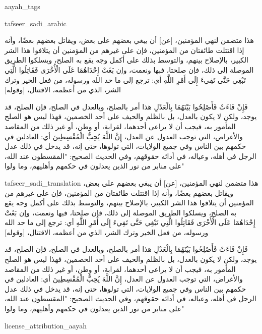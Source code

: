 \begin{taggedblock}{aayah_tags}
\end{taggedblock}
\begin{taggedblock}{tafseer_sadi_arabic}
\begin{Arabic}
هذا متضمن لنهي المؤمنين،
[عن]
أن يبغي بعضهم على بعض، ويقاتل  بعضهم بعضًا، وأنه إذا اقتتلت طائفتان من المؤمنين، فإن على غيرهم من المؤمنين أن يتلافوا هذا الشر الكبير، بالإصلاح بينهم، والتوسط بذلك على أكمل وجه يقع به الصلح، ويسلكوا الطريق الموصلة إلى ذلك، فإن صلحتا، فبها ونعمت، وإن
{ بَغَتْ إِحْدَاهُمَا عَلَى الْأُخْرَى فَقَاتِلُوا الَّتِي تَبْغِي حَتَّى تَفِيءَ إِلَى أَمْرِ اللَّهِ }
أي: ترجع إلى ما حد الله ورسوله، من فعل الخير وترك الشر، الذي من أعظمه، الاقتتال،
[وقوله]

{ فَإِنْ فَاءَتْ فَأَصْلِحُوا بَيْنَهُمَا بِالْعَدْلِ }
هذا أمر بالصلح، وبالعدل في الصلح، فإن الصلح، قد يوجد، ولكن لا يكون بالعدل، بل بالظلم والحيف على أحد الخصمين، فهذا ليس هو الصلح المأمور به، فيجب أن لا يراعى أحدهما، لقرابة، أو وطن، أو غير ذلك من المقاصد والأغراض، التي توجب العدول عن العدل،
{ إِنَّ اللَّهَ يُحِبُّ الْمُقْسِطِينَ }
أي: العادلين في حكمهم بين الناس وفي جميع الولايات، التي تولوها، حتى إنه، قد يدخل في ذلك عدل الرجل في أهله، وعياله، في أدائه حقوقهم، وفي الحديث الصحيح:
"المقسطون عند الله، على منابر من نور الذين يعدلون في حكمهم وأهليهم، وما ولوا"
\end{Arabic}
\end{taggedblock}
\begin{taggedblock}{tafseer_sadi_translation}
هذا متضمن لنهي المؤمنين،
[عن]
أن يبغي بعضهم على بعض، ويقاتل  بعضهم بعضًا، وأنه إذا اقتتلت طائفتان من المؤمنين، فإن على غيرهم من المؤمنين أن يتلافوا هذا الشر الكبير، بالإصلاح بينهم، والتوسط بذلك على أكمل وجه يقع به الصلح، ويسلكوا الطريق الموصلة إلى ذلك، فإن صلحتا، فبها ونعمت، وإن
{ بَغَتْ إِحْدَاهُمَا عَلَى الْأُخْرَى فَقَاتِلُوا الَّتِي تَبْغِي حَتَّى تَفِيءَ إِلَى أَمْرِ اللَّهِ }
أي: ترجع إلى ما حد الله ورسوله، من فعل الخير وترك الشر، الذي من أعظمه، الاقتتال،
[وقوله]

{ فَإِنْ فَاءَتْ فَأَصْلِحُوا بَيْنَهُمَا بِالْعَدْلِ }
هذا أمر بالصلح، وبالعدل في الصلح، فإن الصلح، قد يوجد، ولكن لا يكون بالعدل، بل بالظلم والحيف على أحد الخصمين، فهذا ليس هو الصلح المأمور به، فيجب أن لا يراعى أحدهما، لقرابة، أو وطن، أو غير ذلك من المقاصد والأغراض، التي توجب العدول عن العدل،
{ إِنَّ اللَّهَ يُحِبُّ الْمُقْسِطِينَ }
أي: العادلين في حكمهم بين الناس وفي جميع الولايات، التي تولوها، حتى إنه، قد يدخل في ذلك عدل الرجل في أهله، وعياله، في أدائه حقوقهم، وفي الحديث الصحيح:
"المقسطون عند الله، على منابر من نور الذين يعدلون في حكمهم وأهليهم، وما ولوا"
\end{taggedblock}
\begin{taggedblock}{license_attribution_aayah}

\end{taggedblock}
\begin{comment}
Please use the following for footnotes:- Sample\footnoteQ{Text of Qur'an footnote goes here.}.
Sample\footnoteT{Text of Tafseer footnote goes here.}.
\end{comment}